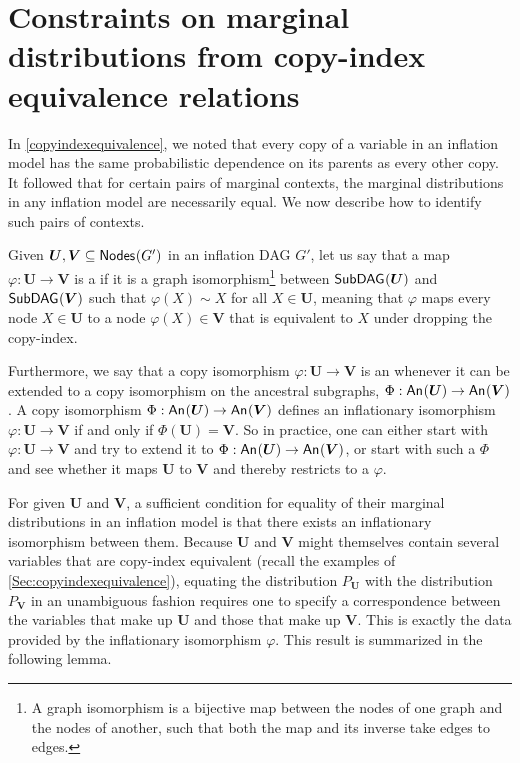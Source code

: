 \documentclass[aps,english,10pt,superscriptaddress,onecolumn,twoside,longbibliography,pra,floatfix,fleqn,nofootinbib]{revtex4-1}%
\newcommand*{\tblue}[1]{{\color{MidnightBlue}{\textbf{#1}}}}
\theoremstyle{definition}
\newcounter{example}[section]
\newcommand{\An}[2][]{{\mathsf{An}_{#1}}\parenths{#2}}
\newcommand{\SmallNamedFunction}[3][]{\operatorname{\mathsf{#2}}_{#1}\parenths{#3}}
\newcommand{\subgraph}[2][]{\SmallNamedFunction[#1]{SubDAG}{#2}}
\newcommand{\nodes}[1]{\SmallNamedFunction{Nodes}{#1}}
\DeclarePairedDelimiter{\parenths}{\lparen}{\rparen}
\begin{document}
\section{Constraints on marginal distributions from copy-index equivalence relations}\label{sec:coincidingdetails}

In \cref{copyindexequivalence}, we noted that every copy of a variable in an inflation model has the same probabilistic dependence on its parents as every other copy. It followed that for certain pairs of marginal contexts, the marginal distributions in any inflation model are necessarily equal. We now describe how to identify such pairs of contexts. 


Given $\bm{U},\bm{V}\subseteq\nodes{G'}$ in an inflation DAG $G'$, let us say that a map $\varphi:\bm{U}\to\bm{V}$ is a \tblue{copy isomorphism} if it is a graph isomorphism\footnote{A graph isomorphism is a bijective map between the nodes of one graph and the nodes of another, such that both the map and its inverse take edges to edges.} between $\subgraph{\bm{U}}$ and $\subgraph{\bm{V}}$ such that $\varphi(X)\sim X$ for all $X\in\bm{U}$, meaning that $\varphi$ maps every node $X\in\bm{U}$ to a node $\varphi(X)\in\bm{V}$ that is equivalent to $X$ under dropping the copy-index.

Furthermore, we say that a copy isomorphism $\varphi : \bm{U}\to\bm{V}$ is an \tblue{inflationary isomorphism} whenever it can be extended to a copy isomorphism on the ancestral subgraphs, $\Phi : \An{\bm{U}}\to\An{\bm{V}}$. 
A copy isomorphism $\Phi: \An{\bm{U}}\to\An{\bm{V}}$ defines an inflationary isomorphism $\varphi:\bm{U}\to\bm{V}$ if and only if $\Phi(\bm{U}) = \bm{V}$.
So in practice, one can either start with $\varphi : \bm{U}\to\bm{V}$ and try to extend it to $\Phi : \An{\bm{U}}\to\An{\bm{V}}$, or start with such a $\Phi$ and see whether it maps $\bm{U}$ to $\bm{V}$ and thereby restricts to a $\varphi$.

For given $\bm{U}$ and $\bm{V}$, a sufficient condition for equality of their marginal distributions in an inflation model is that there exists an inflationary isomorphism between them.  Because $\bm{U}$ and $\bm{V}$ might themselves contain several variables that are copy-index equivalent (recall the examples of \cref{Sec:copyindexequivalence}), equating the distribution $P_{\bm{U}}$ with the distribution $P_{\bm{V}}$ in an unambiguous fashion requires one to specify a correspondence between the variables that make up $\bm{U}$ and those that make up $\bm{V}$. This is exactly the data provided by the inflationary isomorphism $\varphi$.  This result is summarized in the following lemma.
\end{document}
